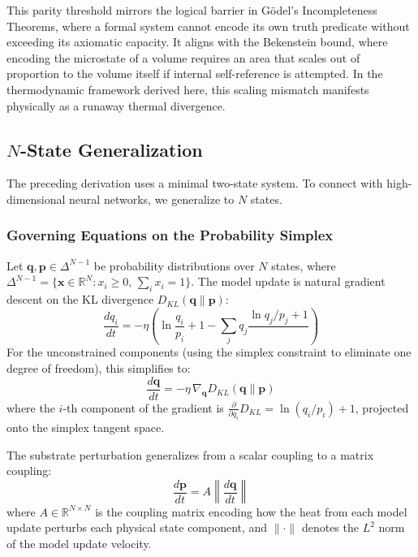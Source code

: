 \documentclass[12pt]{article}
\begin{document}
This parity threshold mirrors the logical barrier in G\"{o}del's Incompleteness Theorems, where a formal system cannot encode its own truth predicate without exceeding its axiomatic capacity. It aligns with the Bekenstein bound, where encoding the microstate of a volume requires an area that scales out of proportion to the volume itself if internal self-reference is attempted. In the thermodynamic framework derived here, this scaling mismatch manifests physically as a runaway thermal divergence.

\subsection{$N$-State Generalization}

The preceding derivation uses a minimal two-state system. To connect with high-dimensional neural networks, we generalize to $N$ states.

\subsubsection{Governing Equations on the Probability Simplex}
Let $\mathbf{q}, \mathbf{p} \in \Delta^{N-1}$ be probability distributions over $N$ states, where $\Delta^{N-1} = \{\mathbf{x} \in \mathbb{R}^N : x_i \ge 0,\, \sum_i x_i = 1\}$. The model update is natural gradient descent on the KL divergence $D_{KL}(\mathbf{q}\|\mathbf{p})$:
\begin{equation}
    \frac{dq_i}{dt} = -\eta \left( \ln \frac{q_i}{p_i} + 1 - \sum_j q_j \frac{\ln q_j / p_j + 1}{\,} \right)
\end{equation}
For the unconstrained components (using the simplex constraint to eliminate one degree of freedom), this simplifies to:
\begin{equation}
    \frac{d\mathbf{q}}{dt} = -\eta\, \nabla_{\mathbf{q}} D_{KL}(\mathbf{q}\|\mathbf{p})
\end{equation}
where the $i$-th component of the gradient is $\frac{\partial}{\partial q_i} D_{KL} = \ln(q_i/p_i) + 1$, projected onto the simplex tangent space.

The substrate perturbation generalizes from a scalar coupling to a matrix coupling:
\begin{equation}
    \frac{d\mathbf{p}}{dt} = A \left\| \frac{d\mathbf{q}}{dt} \right\|
\end{equation}
where $A \in \mathbb{R}^{N \times N}$ is the coupling matrix encoding how the heat from each model update perturbs each physical state component, and $\|\cdot\|$ denotes the $L^2$ norm of the model update velocity.
\end{document}
